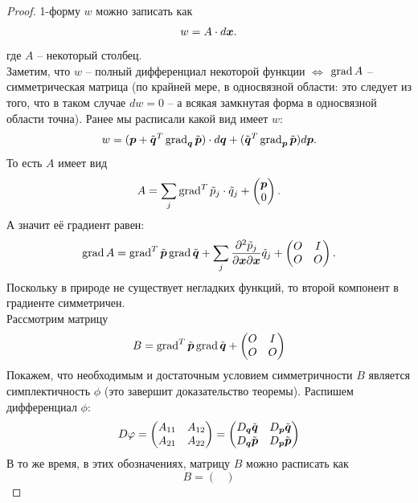 \begin{proof}
    1-форму $w$ можно записать как
    \[
        w = A \cdot d\boldsymbol{x}.
    \]
    где $A$ -- некоторый столбец. \\
    Заметим, что $w$ -- полный дифференциал некоторой функции $\Longleftrightarrow$ $\operatorname{grad} A$ -- симметрическая матрица (по крайней мере, в односвязной области: это следует из того, что в таком случае $dw = 0$ -- а всякая замкнутая форма в односвязной области точна).
    Ранее мы расписали какой вид имеет $w$:
    \[
        w = (\boldsymbol{p} + \tilde{\boldsymbol{q}}^T\operatorname{grad}_{\boldsymbol{q}} \tilde{\boldsymbol{p}})\cdot d\boldsymbol{q} + (\tilde{\boldsymbol{q}}^T\operatorname{grad}_{\boldsymbol{p}}\tilde{\boldsymbol{p}})d\boldsymbol{p}.
    \]
    То есть $A$ имеет вид
    \[
        A = \sum\limits_{j} \grad^T \tilde{p}_j \cdot \tilde{q}_j + \begin{pmatrix*} \bt{p} \\ 0
        \end{pmatrix*}.
    \]
    А значит её градиент равен:
    \[
        \grad A = \grad^T \tilde{\bt{p}} \grad \tilde{\bt{q}} + \sum\limits_{j} \dfrac{\partial^2 \tilde{p}_j}{\partial \bt{x} \partial \bt{x}} \tilde{q}_j + \begin{pmatrix*} O & I \\ O & O
        \end{pmatrix*}.
    \]
    Поскольку в природе не существует негладких функций, то второй компонент в градиенте симметричен. \\
    Рассмотрим матрицу
    \[
        B = \grad^T \tilde{\bt{p}} \grad \tilde{\bt{q}} + \begin{pmatrix*} O & I \\ O & O \end{pmatrix*}
    \]
    Покажем, что необходимым и достаточным условием симметричности $B$ является симплектичность $\phi$ (это завершит доказательство теоремы).
    Распишем дифференциал $\phi$:
    \[
        D\phi =
        \begin{pmatrix*}
        A_{11} & A_{12} \\ A_{21} & A_{22}
        \end{pmatrix*} =
        \begin{pmatrix*}
        D_{\bt{q}} \tilde{\bt{q}} & D_{\bt{p}} \tilde{\bt{q}} \\ D_{\bt{q}} \tilde{\bt{p}} & D_{\bt{p}} \tilde{\bt{p}}
        \end{pmatrix*}
    \]
    В то же время, в этих обозначениях, матрицу $B$ можно расписать как 
    \[
        B = 
        \begin{pmatrix*}

\end{pmatrix*}\]
\end{proof}
